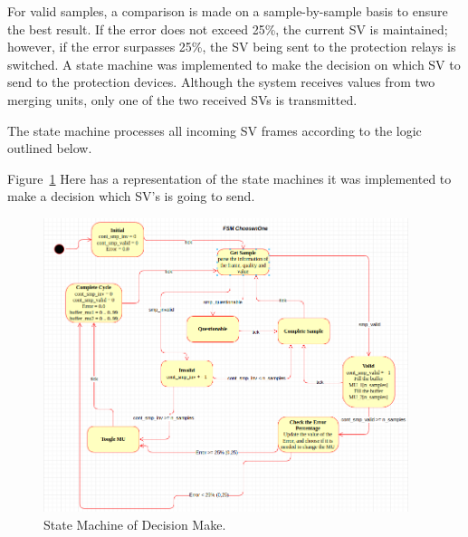 For valid samples, a comparison is made on a sample-by-sample basis to ensure the best result. If the error does not exceed 25\%, the current SV is maintained; however, if the error surpasses 25\%, the SV being sent to the protection relays is switched. A state machine was implemented to make the decision on which SV to send to the protection devices. Although the system receives values from two merging units, only one of the two received SVs is transmitted.

The state machine processes all incoming SV frames according to the logic outlined below.

Figure~\ref{fig:state_machine} Here has a representation of the state machines it was implemented to make a decision which SV's is going to send. 

\begin{figure}[tbh!]
	\centering
	\includegraphics[width=0.95\textwidth, keepaspectratio]{ch4/assets/state_machine.png} %
	\caption{State Machine of Decision Make.}
	\label{fig:state_machine}
\end{figure}


